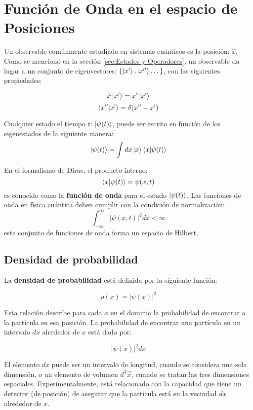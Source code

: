 \section{Función de Onda en el espacio de Posiciones}
Un observable comúnmente estudiado en sistemas cuánticos es la posición: $\hat{x}$. Como se mencionó en la sección \autoref{sec:Estados y Operadores}, un observable da lugar a un conjunto de eigenvectores: $\{\ket{x'}, \ket{x''}\dots \}$, con las siguientes propiedades:

$$\hat{x}\ket{x'} = x'\ket{x'}$$
$$\bra{x''}\ket{x'}=\delta(x''-x')$$

Cualquier estado el tiempo $t$: $\ket{\psi(t)}$, puede ser escrito en función de los eigenestados de la siguiente manera:
$$\ket{\psi(t)} = \int dx\ket{x}\bra{x}\ket{\psi(t)}$$

En el formalismo de Dirac, el producto interno:
$$\bra{x}\ket{\psi(t)} = \psi(x,t)$$
es conocido como la \textbf{función de onda} para el estado $\ket{\psi(t)}$. Las funciones de onda en física cuántica deben cumplir con la condición de normalización:
$$\int_{-\infty}^{\infty}| \psi(x,t)|^2dx < \infty $$
este conjunto de funciones de onda forma un espacio de Hilbert.

\subsection{Densidad de probabilidad}

La \textbf{densidad de probabilidad} está definida por la siguiente función:

\begin{equation}
 \label{eq:density probablity}
\rho(x)=|\psi(x)|^2
\end{equation}

Esta relación describe para cada $x$ en el dominio la probabilidad de encontrar a la partícula en esa posición. La probabilidad de encontrar una partícula en un intervalo $dx$ alrededor de $x$ está dado por:

 $$|\psi(x)|^2 dx $$

 El elemento $dx$ puede ser un intervalo de longitud, cuando se considera una sola dimensión, o un elemento de volumen $d^3\vec{x}$, cuando se tratan las tres dimensiones espaciales. Experimentalmente, está relacionado con la capacidad que tiene un detector (de posición) de asegurar que la partícula está en la vecindad $dx$ alrededor de $x$.



